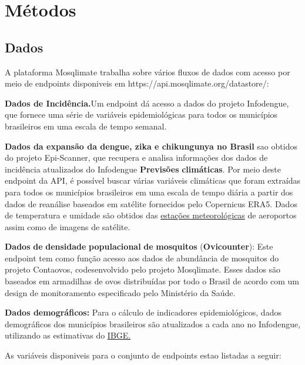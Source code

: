 \section{Métodos}

\subsection{Dados}

A plataforma Mosqlimate trabalha sobre vários fluxos de dados com acesso por meio de endpoints disponiveis em https://api.mosqlimate.org/datastore/: 

 \textbf{Dados de Incidência.}Um endpoint dá acesso a dados do projeto Infodengue, que fornece uma série de variáveis epidemiológicas para todos os municípios brasileiros em uma escala de tempo semanal. 
 
\textbf{Dados  da expansão da dengue, zika e chikungunya no Brasil }sao obtidos do projeto Epi-Scanner, que recupera e analisa  informações dos dados de incidência atualizados do Infodengue  
 \textbf{P}\textbf{revisões} \textbf{climáticas}. Por meio deste endpoint da API, é possível buscar várias variáveis climáticas que foram extraídas para todos os municípios brasileiros em uma escala de tempo diária a partir dos dados de reanálise baseados em satélite fornecidos pelo Copernicus ERA5. Dados de temperatura e umidade são obtidos das \href{https://estacoes.dengue.mat.br/}{estações meteorológicas} de aeroportos assim como de imagens de satélite.

 \textbf{D}\textbf{ados} \textbf{de} \textbf{densidade} \textbf{populacional} \textbf{de} \textbf{mosquitos} (\textbf{Ovicounter}): Este endpoint tem como função acesso aos dados de abundância de mosquitos do projeto Contaovos, codesenvolvido pelo projeto Mosqlimate. Esses dados são baseados em armadilhas de ovos distribuídas por todo o Brasil de acordo com um design de monitoramento especificado pelo Ministério da Saúde. 

 \textbf{Dados demográficos:} Para o cálculo de indicadores epidemiológicos, dados demográficos dos municípios brasileiros são atualizados a cada ano no Infodengue, utilizando as estimativas do \href{https://www.ibge.gov.br/pt/inicio.html}{IBGE.}

As variáveis disponiveis para o conjunto de endpoints estao listadas a seguir: 

